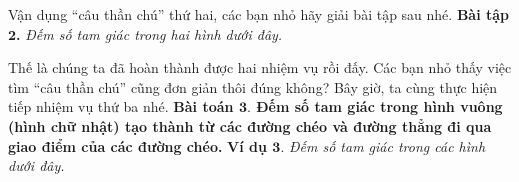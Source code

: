 	Vận dụng “câu thần chú” thứ hai, các bạn nhỏ hãy giải bài tập sau nhé.
	\vskip 0.1cm
	\textbf{\color{toancuabi}Bài tập $\pmb{2}$.} \textit{Đếm số tam giác trong hai hình dưới đây.}
	\begin{figure}[H]
		\centering
		\vspace*{-5pt}
		\captionsetup{labelformat= empty, justification=centering}
		\captionsetup[subfigure]{labelformat=empty}
		\hfill{}
		\hfill
		\hfill
		\vspace*{-10pt}
	\end{figure} 
	Thế là chúng ta đã hoàn thành được hai nhiệm vụ rồi đấy. Các bạn nhỏ thấy việc tìm “câu thần chú” cũng đơn giản thôi đúng không? Bây giờ, ta cùng thực hiện tiếp nhiệm vụ thứ ba nhé.
	\vskip 0.1cm
	\textbf{\color{toancuabi}Bài toán $\pmb{3.}$ Đếm số tam giác trong hình vuông (hình chữ nhật) tạo thành từ các đường chéo và đường thẳng đi qua giao điểm của các đường chéo.}
	\vskip 0.1cm
	\textbf{\color{toancuabi}Ví dụ $\pmb{3.}$} \textit{Đếm số tam giác trong các hình dưới đây.}
